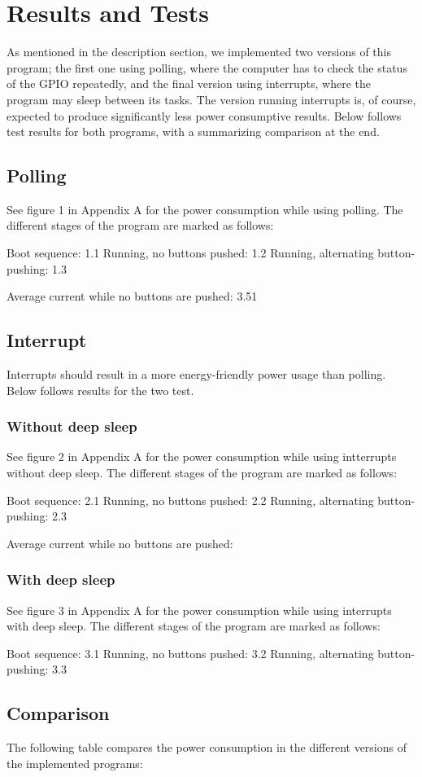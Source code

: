 \section{Results and Tests}

As mentioned in the description section, we implemented two versions of this program; the first one using polling, where the computer has to check the status of the GPIO repeatedly, and the final version using interrupts, where the program may sleep between its tasks. The version running interrupts is, of course, expected to produce significantly less power consumptive results. Below follows test results for both programs, with a summarizing comparison at the end.

\subsection{Polling}

See figure 1 in Appendix A for the power consumption while using polling. The different stages of the program are marked as follows:

Boot sequence: 1.1
Running, no buttons pushed: 1.2
Running, alternating button-pushing: 1.3

Average current while no buttons are pushed: 3.51

\subsection{Interrupt}

Interrupts should result in a more energy-friendly power usage than polling. Below follows results for the two test.

\subsubsection{Without deep sleep}

See figure 2 in Appendix A for the power consumption while using intterrupts without deep sleep. The different stages of the program are marked as follows:

Boot sequence: 2.1
Running, no buttons pushed: 2.2
Running, alternating button-pushing: 2.3

Average current while no buttons are pushed: 

\subsubsection{With deep sleep}

See figure 3 in Appendix A for the power consumption while using interrupts with deep sleep. The different stages of the program are marked as follows:

Boot sequence: 3.1
Running, no buttons pushed: 3.2
Running, alternating button-pushing: 3.3

\subsection{Comparison}

The following table compares the power consumption in the different versions of the implemented programs:


